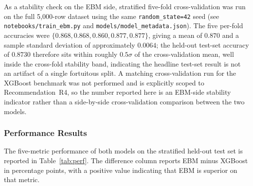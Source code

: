\documentclass[journal]{./IEEE/IEEEtran}
\begin{document}
As a stability check on the EBM side, stratified five-fold cross-validation was run on the full 5{,}000-row dataset using the same \texttt{random\_state=42} seed (see \texttt{notebooks/train\_ebm.py} and \texttt{models/model\_metadata.json}). The five per-fold accuracies were $\{0.868, 0.868, 0.860, 0.877, 0.877\}$, giving a mean of $0.870$ and a sample standard deviation of approximately $0.0064$; the held-out test-set accuracy of $0.8730$ therefore sits within roughly $0.5\sigma$ of the cross-validation mean, well inside the cross-fold stability band, indicating the headline test-set result is not an artifact of a single fortuitous split. A matching cross-validation run for the XGBoost benchmark was not performed and is explicitly scoped to Recommendation~R4, so the number reported here is an EBM-side stability indicator rather than a side-by-side cross-validation comparison between the two models.

\subsubsection{Performance Results}

The five-metric performance of both models on the stratified held-out test set is reported in Table~\ref{tab:perf}. The difference column reports EBM minus XGBoost in percentage points, with a positive value indicating that EBM is superior on that metric.
\end{document}
